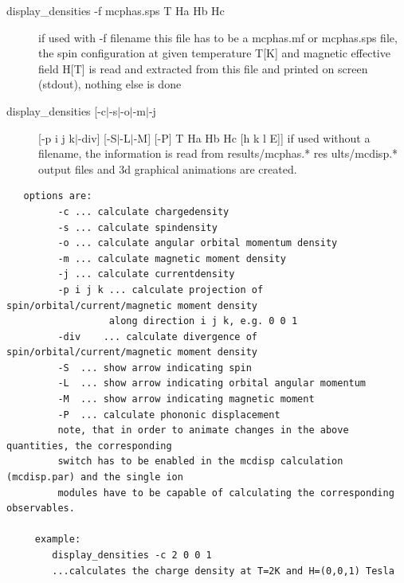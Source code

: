 \begin{description} 
\item[ display\_densities -f mcphas.sps T Ha Hb Hc]
 if used with -f filename this file has to be a mcphas.mf or mcphas.sps file,
the spin configuration
   at given temperature T[K] and magnetic effective field H[T]
    is read and extracted from this file and printed on screen (stdout), nothing
 else is done
\item[display\_densities [-c$|$-s$|$-o$|$-m$|$-j] [-p i j k$|$-div] [-S$|$-L$|$-M] [-P] T Ha Hb Hc [h k l E]]
 if used without a filename, the information is read from results/mcphas.* res
ults/mcdisp.*
   output files and 3d graphical animations are created.
\end{description} 
\begin{verbatim}
   options are:
         -c ... calculate chargedensity
         -s ... calculate spindensity
         -o ... calculate angular orbital momentum density
         -m ... calculate magnetic moment density
         -j ... calculate currentdensity
         -p i j k ... calculate projection of spin/orbital/current/magnetic moment density
                  along direction i j k, e.g. 0 0 1
         -div    ... calculate divergence of spin/orbital/current/magnetic moment density
         -S  ... show arrow indicating spin
         -L  ... show arrow indicating orbital angular momentum
         -M  ... show arrow indicating magnetic moment
         -P  ... calculate phononic displacement
         note, that in order to animate changes in the above quantities, the corresponding
         switch has to be enabled in the mcdisp calculation (mcdisp.par) and the single ion
         modules have to be capable of calculating the corresponding observables.

     example:
        display_densities -c 2 0 0 1
        ...calculates the charge density at T=2K and H=(0,0,1) Tesla
\end{verbatim}

